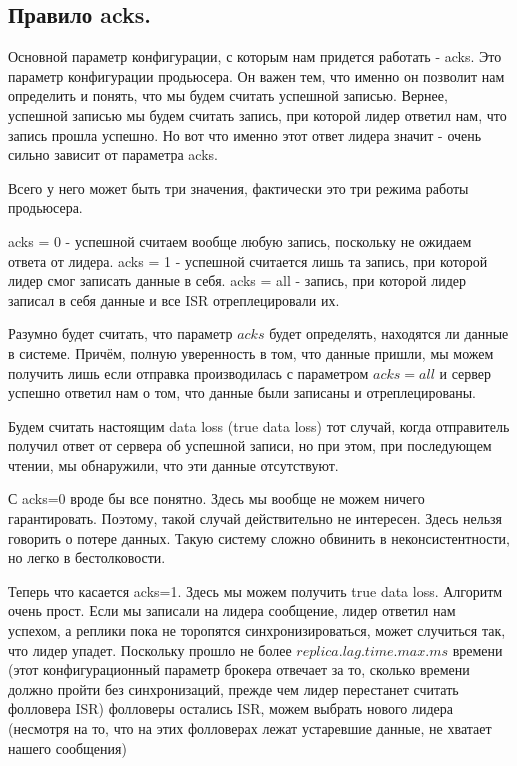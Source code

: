 \documentclass[11pt]{article}
\begin{document}
    \subsection{Правило acks.}
    Основной параметр конфигурации, с которым нам придется работать - acks. Это параметр конфигурации продьюсера. Он
    важен тем, что именно он позволит нам определить и понять, что мы будем считать успешной записью. Вернее,
    успешной записью мы будем считать запись, при которой лидер ответил нам, что запись прошла успешно. Но вот что
    именно этот ответ лидера значит - очень сильно зависит от параметра acks.

    Всего у него может быть три значения, фактически это три режима работы продьюсера.

    acks = 0 - успешной считаем вообще любую запись, поскольку не ожидаем ответа от лидера.
    acks = 1 - успешной считается лишь та запись, при которой лидер смог записать данные в себя.
    acks = all - запись, при которой лидер записал в себя данные и все ISR отреплецировали их.

    Разумно будет считать, что параметр $acks$ будет определять, находятся ли данные в системе. Причём, полную уверенность в том, что данные пришли, мы можем получить лишь если отправка производилась с параметром $acks=all$ и сервер успешно ответил нам о том, что данные были записаны и отреплецированы.

    Будем считать настоящим data loss (true data loss) тот случай, когда отправитель получил ответ от сервера об
    успешной записи, но при этом, при последующем чтении, мы обнаружили, что эти данные отсутствуют.

    С acks=0 вроде бы все понятно. Здесь мы вообще не можем ничего гарантировать. Поэтому, такой случай действительно
    не интересен. Здесь нельзя говорить о потере данных. Такую систему сложно обвинить в неконсистентности, но легко в бестолковости.

    Теперь что касается acks=1. Здесь мы можем получить true data loss. Алгоритм очень прост. Если мы записали на
    лидера сообщение, лидер ответил нам успехом, а реплики пока не торопятся синхронизироваться, может случиться так,
    что лидер упадет. Поскольку прошло не более $replica.lag.time.max.ms$ времени (этот конфигурационный параметр
    брокера отвечает за то, сколько времени должно пройти без синхронизаций, прежде чем лидер перестанет считать
    фолловера ISR) фолловеры остались ISR, можем выбрать нового лидера (несмотря на то, что на этих фолловерах лежат
    устаревшие данные, не хватает нашего сообщения)
\end{document}
